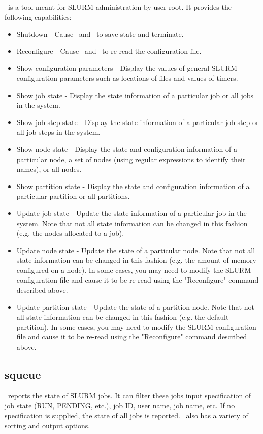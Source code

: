\scontrol\ is a tool meant for SLURM administration by user root. 
It provides the following capabilities:
\begin{itemize}
\item Shutdown - Cause \slurmctld\ and \slurmd\ to save state and terminate.
\item Reconfigure - Cause \slurmctld\ and \slurmd\ to re-read the 
configuration file.
\item Show configuration parameters - Display the values of general SLURM 
configuration parameters such as locations of files and values of timers.  
\item Show job state - Display the state information of a particular job 
or all jobs in the system.
\item Show job step state - Display the state information of a particular 
job step or all job steps in the system.
\item Show node state - Display the state and configuration information 
of a particular node, a set of nodes (using regular expressions to 
identify their names), or all nodes.
\item Show partition state - Display the state and configuration information 
of a particular partition or all partitions.
\item Update job state - Update the state information of a particular job 
in the system. Note that not all state information can be changed in this 
fashion (e.g. the nodes allocated to a job).
\item Update node state - Update the state of a particular node. Note that 
not all state information can be changed in this fashion (e.g. the amount 
of memory configured on a node). In some cases, you may need to modify 
the SLURM configuration file and cause it to be re-read using the "Reconfigure" 
command described above.
\item Update partition state - Update the state of a partition node. Note that 
not all state information can be changed in this fashion (e.g. the default 
partition). In some cases, you may need to modify the SLURM configuration 
file and cause it to be re-read using the "Reconfigure" command described above.
\end{itemize}

\subsection{squeue}

\squeue\ reports the state of SLURM jobs.  It can filter these
jobs input specification of job state (RUN, PENDING, etc.), job ID,
user name, job name, etc.  If no specification is supplied, the state of
all jobs is reported. \squeue\ also has a variety of sorting and 
output options.

